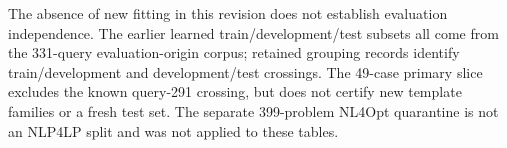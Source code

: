 The absence of new fitting in this revision does not establish evaluation
independence. The earlier learned train/development/test subsets all come
from the 331-query evaluation-origin corpus; retained grouping records
identify train/development and development/test crossings. The 49-case
primary slice excludes the known query-291 crossing, but does not certify
new template families or a fresh test set. The separate 399-problem NL4Opt
quarantine is not an NLP4LP split and was not applied to these tables.
